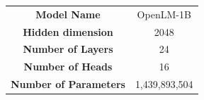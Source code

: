 \centering
    \resizebox{0.99\linewidth}{!}
    {
    \begin{tabular}{c|c}
    \toprule[1.5pt]
      {\bf Model Name} & OpenLM-1B\\
      {\bf Hidden dimension} & 2048\\
      {\bf Number of  Layers} & 24\\
      {\bf Number of  Heads} & 16\\
      {\bf Number of  Parameters} & 1,439,893,504\\
        \bottomrule[1pt]
    \end{tabular}
        }